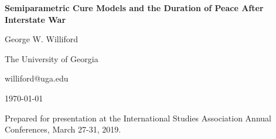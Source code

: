 \documentclass[letterpaper, 12pt]{article}
\theoremstyle{plain}
\begin{document}

\begin{comment}
	$\ti$ = (ti)\\
	$\di$ = censoring indicator (di)\\
	$\yi$ = cure indicator (yi)\\
	$p$ = $\Pr(Y = 1)$\\
\textbf{Covariates}\\
	$\xvec$ = vector of hazard/latency covariates\\
	$\zvec$ = vector of cure/incidence covariates\\
	$\xib$ = xib\\
	$\zig$ = zig\\
	$\exb$ 
	$\ezg$
\textbf{Hazard functions}\\
	$\hu$ = Hazard function for uncured subjects (hu)\\
	$\ho$ = Baseline hazard function for uncured subjects (ho)\\
	$\hux$\\
	$\hox$\\	
\textbf{Survivor Functions}\\
	$\spop$ = Population survivor function (spop)\\
	$\su$ = Survivor uncured covariates\\
	$\so$ = Baseline survivor uncured covariates\\
	$\sux$ = Survivor function for uncured subjects (sux)\\
	$\sox$ = Baseline survivor function for uncured subjects (sox)\\
	$\sohat$ = Estimated Baseline survivor function for uncured subjects (sohat) \\
\textbf{Estimation Quantities}\\ 
	$\wi$\\
\newpage
\end{comment}

\begin{center}
\textbf{Semiparametric Cure Models and the Duration of Peace After Interstate War}%


George W. Williford

The University of Georgia

williford@uga.edu

\today

\vspace{8cm}
Prepared for presentation at the International Studies Association Annual Conferences, March 27-31, 2019.


\end{center}
\end{document}
